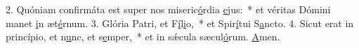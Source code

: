 2. Quóniam confirmáta est super nos miseric\uline{ó}rdia \uline{e}jus:~* et véritas Dómini manet \uline{i}n æt\uline{é}rnum.
3. Glória Patri, et F\uline{í}l\uline{i}o,~* et Spir\uline{í}tui S\uline{a}ncto.
4. Sicut erat in princípio, et n\uline{u}nc, et s\uline{e}mper,~* et in sǽcula sæcul\uline{ó}rum. \uline{A}men.
